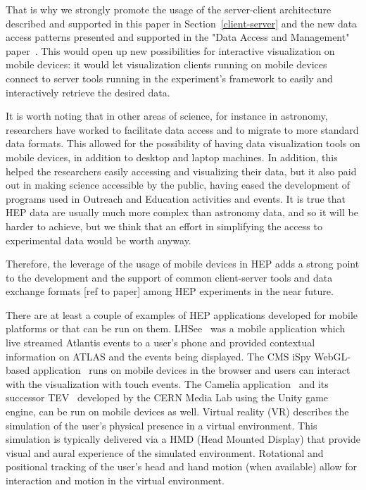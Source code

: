 \documentclass[12pt,a4paper]{article}
\begin{document}
That is why we strongly promote the usage of the server-client architecture described and supported in this paper in Section~\ref{client-server}
and the new data access patterns presented and supported in the "Data Access and Management" paper~\cite{hsf-cwp-data}. This would open
up new possibilities for interactive visualization on mobile devices: it would let visualization clients running on mobile devices
connect to server tools running in the experiment's framework to easily and interactively retrieve the desired data.

It is worth noting that in other areas of science, for instance in astronomy, researchers have worked to facilitate data
access and to migrate to more standard data formats. This allowed for the possibility of having data visualization tools
on mobile devices, in addition to desktop and laptop machines. In addition, this helped the researchers easily accessing and visualizing
their data, but it also paid out in making science accessible by the public, having eased the development of programs used in
Outreach and Education activities and events. It is true that HEP data are usually much more complex than astronomy data, and so it
will be harder to achieve, but we think that an effort in simplifying the access to experimental data would be worth anyway.

Therefore, the leverage of the usage of mobile devices in HEP adds a strong point to the development and the support of common
client-server tools and data exchange formats [ref to paper] among HEP experiments in the near future.

There are at least a couple of examples of HEP applications developed for mobile platforms or that can be run on them. LHSee~\cite{LHSee}
was a mobile application which live streamed Atlantis events to a user’s phone and provided contextual information on ATLAS and the
events being displayed. The CMS iSpy WebGL-based application~\cite{CMSISpyWebGL} runs on mobile devices in the browser and users can interact
with the visualization with touch events. The Camelia application~\cite{CERNCamelia} and its successor TEV~\cite{CERNTEV} developed by the
CERN Media Lab using the Unity game engine, can be run on mobile devices as well.
Virtual reality (VR) describes the simulation of the user’s physical presence in a virtual environment. This simulation is typically
delivered via a HMD (Head Mounted Display) that provide visual and aural experience of the simulated environment. Rotational and
positional tracking of the user’s head and hand motion (when available) allow for interaction and motion in the virtual environment.
\end{document}
